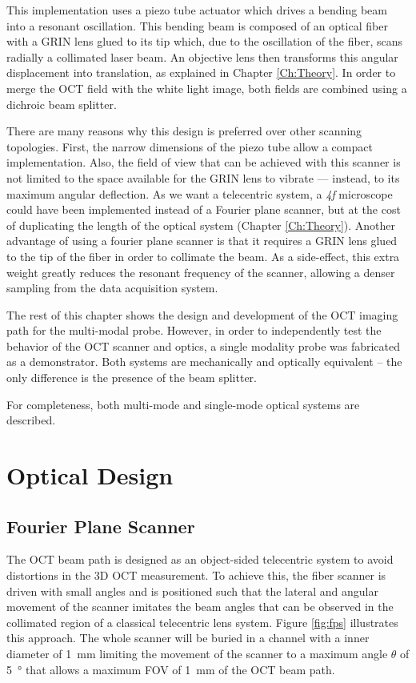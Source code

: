 This implementation uses a piezo tube actuator which drives a bending beam into a resonant oscillation. This bending beam is composed of an optical fiber with a GRIN lens glued to its tip which, due to the oscillation of the fiber, scans radially a collimated laser beam. An objective lens then transforms this angular displacement into translation, as explained in Chapter \ref{Ch:Theory}. In order to merge the OCT field with the white light image, both fields are combined using a dichroic beam splitter.

There are many reasons why this design is preferred over other scanning topologies. First, the narrow dimensions of the piezo tube allow a compact implementation. Also, the field of view that can be achieved with this scanner is not limited to the space available for the GRIN lens to vibrate --- instead, to its maximum angular deflection. As we want a telecentric system, a \textit{4f} microscope could have been implemented instead of a Fourier plane scanner, but at the cost of duplicating the length of the optical system (Chapter \ref{Ch:Theory}). Another advantage of using a fourier plane scanner is that it requires a GRIN lens glued to the tip of the fiber in order to collimate the beam. As a side-effect, this extra weight greatly reduces the resonant frequency of the scanner, allowing a denser sampling from the data acquisition system. 

The rest of this chapter shows the design and development of the OCT imaging path for the multi-modal probe. However, in order to independently test the behavior of the OCT scanner and optics, a single modality probe was fabricated as a demonstrator. Both systems are mechanically and optically equivalent -- the only difference is the presence of the beam splitter. 

For completeness, both multi-mode and single-mode optical systems are described.


\clearpage
\section{Optical Design}

\subsection*{Fourier Plane Scanner}
The OCT beam path is designed as an object-sided telecentric system to avoid distortions in the 3D OCT measurement. To achieve this, the fiber scanner is driven with small angles and is positioned such that the lateral and angular movement of the scanner imitates the beam angles that can be observed in the collimated region of a classical telecentric lens system. Figure \ref{fig:fps} illustrates this approach. The whole scanner will be buried in a channel with a inner diameter of \SI{1}{\milli\meter} limiting the movement of the scanner to a maximum angle $\theta$ of \SI{5}{\degree} that allows a maximum FOV of \SI{1}{\milli\meter} of the OCT beam path.



